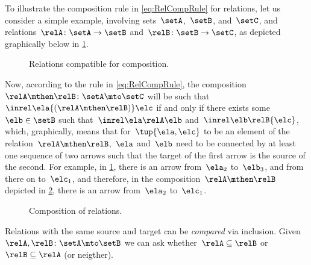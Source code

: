 To illustrate the composition rule in \cref{eq:RelCompRule} for relations, let us consider a simple example, involving sets~$\setA$,~$\setB$, and~$\setC$, and relations~$\relA \colon \setA \to \setB$ and~$\relB \colon \setB \to \setC$, as depicted graphically below in \cref{fig:example_rel_composable}.
%
\begin{figure}[h!]
    \centering
    \caption{Relations compatible for composition.}
    \label{fig:example_rel_composable}
\end{figure}
%
Now, according to the rule in \cref{eq:RelCompRule}, the composition~$\relA \mthen \relB \colon \setA \mto \setC$ will be such that~$\inrel \ela {(\relA \mthen \relB)} \elc$ if and only if there exists some~$\elb \in \setB$ such that~$\inrel \ela \relA \elb $ and~$\inrel \elb \relB{\elc}$, which, graphically, means that for~$\tup{\ela,\elc}$ to be an element of the relation~$\relA \mthen \relB$,~$\ela$ and~$\elb$ need to be connected by at least one sequence of two arrows such that the target of the first arrow is the source of the second.
For example, in \cref{fig:example_rel_composable}, there is an arrow from~$\ela_2$ to~$\elb_3$, and from there on to~$\elc_1$, and therefore, in the composition~$\relA \mthen \relB$ depicted in \cref{fig:example_rel_composed}, there is an arrow from~$\ela_2$ to~$\elc_1$.
%
\begin{figure}[h!]
    \centering
    \caption{Composition of relations.}
    \label{fig:example_rel_composed}
\end{figure}

\begin{remark}
    Relations with the same source and target can be \emph{compared} via inclusion.
    Given~$\relA, \relB \colon \setA\mto \setB$  we can ask whether~$\relA\subseteq \relB$ or~$\relB\subseteq \relA$ (or neigther).
\end{remark}
